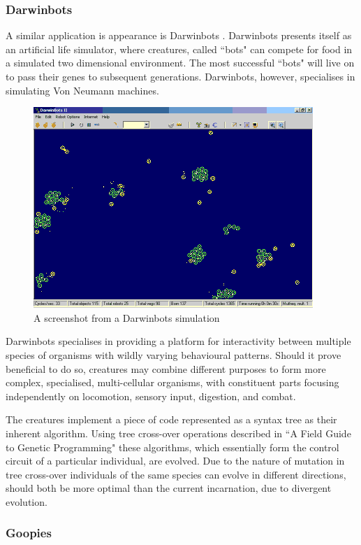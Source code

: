 \subsubsection{Darwinbots}

A similar application is appearance is Darwinbots \cite{darwinbots}. Darwinbots presents itself as an artificial life simulator, where creatures, called ``bots" can compete for food in a simulated two dimensional environment. The most successful ``bots" will live on to pass their genes to subsequent generations. Darwinbots, however, specialises in simulating Von Neumann machines.
\begin{figure}[!th]
	\centering
	\includegraphics[scale=1]{images/darwinbots}
	\caption{A screenshot from a Darwinbots simulation}
\end{figure}

Darwinbots specialises in providing a platform for interactivity between multiple species of organisms with wildly varying behavioural patterns. Should it prove beneficial to do so, creatures may combine different purposes to form more complex, specialised, multi-cellular organisms, with constituent parts focusing independently on locomotion, sensory input, digestion, and combat.

The creatures implement a piece of code represented as a syntax tree as their inherent algorithm. Using tree cross-over operations described in ``A Field Guide to Genetic Programming" \cite{fieldguide} these algorithms, which essentially form the control circuit of a particular individual, are evolved. Due to the nature of mutation in tree cross-over individuals of the same species can evolve in different directions, should both be more optimal than the current incarnation, due to divergent evolution.

\subsubsection{Goopies}

